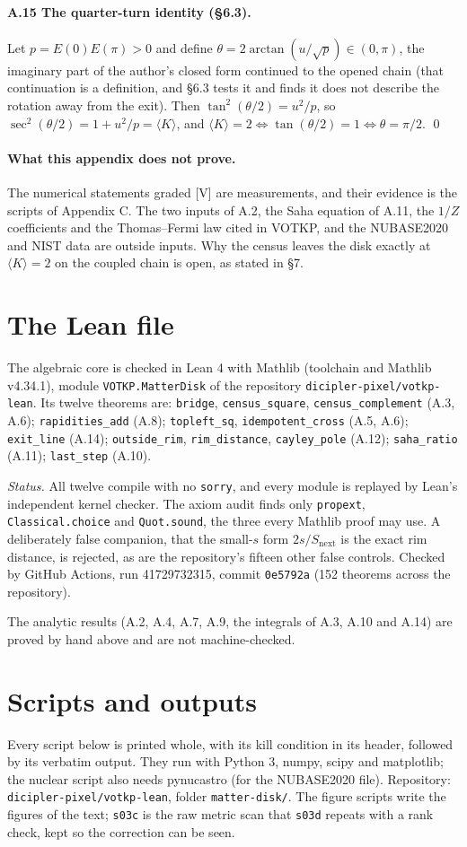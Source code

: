 \documentclass[11pt]{article}
\theoremstyle{definition}
\newcommand{\grade}[1]{\textsf{\small[#1]}}
\newcommand{\LEANSTATUS}{\emph{Status.} All twelve compile with no \texttt{sorry}, and every module is replayed by Lean's independent kernel checker. The axiom audit finds only \texttt{propext}, \texttt{Classical.choice} and \texttt{Quot.sound}, the three every Mathlib proof may use. A deliberately false companion, that the small-$s$ form $2s/S_{\mathrm{next}}$ is the exact rim distance, is rejected, as are the repository's fifteen other false controls. Checked by GitHub Actions, run 41729732315, commit \texttt{0e5792a} (152 theorems across the repository).}
\begin{document}
\paragraph{A.15 The quarter-turn identity (§6.3).}
Let $p=E(0)E(\pi)>0$ and define $\theta=2\arctan(u/\sqrt p)\in(0,\pi)$, the imaginary part of the author's closed form continued to the opened chain (that continuation is a definition, and §6.3 tests it and finds it does not describe the rotation away from the exit). Then $\tan^2(\theta/2)=u^2/p$, so $\sec^2(\theta/2)=1+u^2/p=\langle K\rangle$, and $\langle K\rangle=2\iff\tan(\theta/2)=1\iff\theta=\pi/2$. \qed

\paragraph{What this appendix does not prove.} The numerical statements graded \grade{V} are measurements, and their evidence is the scripts of Appendix C. The two inputs of A.2, the Saha equation of A.11, the $1/Z$ coefficients and the Thomas–Fermi law cited in VOTKP, and the NUBASE2020 and NIST data are outside inputs. Why the census leaves the disk exactly at $\langle K\rangle=2$ on the coupled chain is open, as stated in §7.

\section{The Lean file}
The algebraic core is checked in Lean 4 with Mathlib (toolchain and Mathlib v4.34.1), module \texttt{VOTKP.MatterDisk} of the repository \texttt{dicipler-pixel/votkp-lean}. Its twelve theorems are: \texttt{bridge}, \texttt{census\_square}, \texttt{census\_complement} (A.3, A.6); \texttt{rapidities\_add} (A.8); \texttt{topleft\_sq}, \texttt{idempotent\_cross} (A.5, A.6); \texttt{exit\_line} (A.14); \texttt{outside\_rim}, \texttt{rim\_distance}, \texttt{cayley\_pole} (A.12); \texttt{saha\_ratio} (A.11); \texttt{last\_step} (A.10).

\LEANSTATUS

The analytic results (A.2, A.4, A.7, A.9, the integrals of A.3, A.10 and A.14) are proved by hand above and are not machine-checked.



\section{Scripts and outputs}
Every script below is printed whole, with its kill condition in its header, followed by its verbatim output. They run with Python 3, numpy, scipy and matplotlib; the nuclear script also needs pynucastro (for the NUBASE2020 file). Repository: \texttt{dicipler-pixel/votkp-lean}, folder \texttt{matter-disk/}. The figure scripts write the figures of the text; \texttt{s03c} is the raw metric scan that \texttt{s03d} repeats with a rank check, kept so the correction can be seen.
\end{document}

